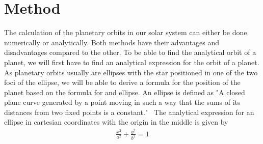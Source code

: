 \documentclass[reprint,english,notitlepage]{revtex4-2}
\begin{document}
\section{Method}
The calculation of the planetary orbits in our solar system can either be done numerically or analytically.
Both methods have their advantages and disadvantages compared to the other.
To be able to find the analytical orbit of a planet, we will first have to find an analytical expression for the orbit of a planet.
As planetary orbits usually are ellipses with the star positioned in one of the two foci of the ellipse, we will be able to derive a formula for the position of the planet based on the formula for and ellipse.
An ellipse is defined as "A closed plane curve generated by a point moving in such a way that the sums of its distances from two fixed points is a constant."~\parencite[][]{mw_ellipse}
The analytical expression for an ellipse in cartesian coordinates with the origin in the middle is given by
\begin{align}
    \frac{x^2}{a^2} + \frac{y^2}{b^2} = 1 \label{ellipse_analytic_cart}
\end{align}
\end{document}

